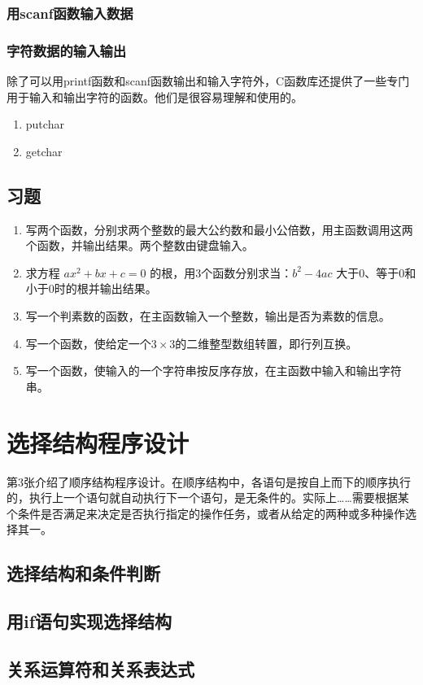 \subsection{用scanf函数输入数据}
\subsection{字符数据的输入输出}
除了可以用printf函数和scanf函数输出和输入字符外，C函数库还提供了一些专门用于输入和输出字符的函数。他们是很容易理解和使用的。
\begin{enumerate}
	\item putchar
	\item getchar
\end{enumerate}

\section{习题}
\begin{enumerate}
	\item 写两个函数，分别求两个整数的最大公约数和最小公倍数，用主函数调用这两个函数，并输出结果。两个整数由键盘输入。
	\item 求方程 $ax^2 + bx + c = 0$ 的根，用3个函数分别求当：$b^2 - 4ac$ 大于0、等于0和小于0时的根并输出结果。
	\item 写一个判素数的函数，在主函数输入一个整数，输出是否为素数的信息。
	\item 写一个函数，使给定一个$3 \times 3$的二维整型数组转置，即行列互换。
	\item 写一个函数，使输入的一个字符串按反序存放，在主函数中输入和输出字符串。
\end{enumerate}

\chapter{选择结构程序设计}
第3张介绍了顺序结构程序设计。在顺序结构中，各语句是按自上而下的顺序执行的，执行上一个语句就自动执行下一个语句，是无条件的。实际上……需要根据某个条件是否满足来决定是否执行指定的操作任务，或者从给定的两种或多种操作选择其一。
\section{选择结构和条件判断}
\section{用if语句实现选择结构}
\section{关系运算符和关系表达式}
